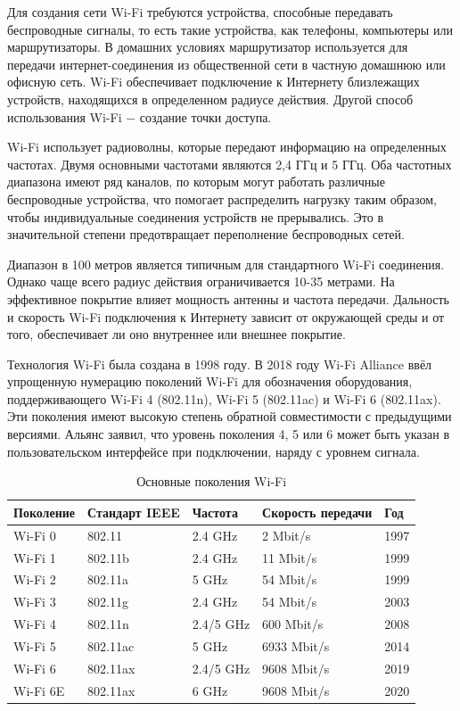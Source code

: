 	Для создания сети Wi-Fi требуются устройства, способные передавать беспроводные сигналы, то есть 
	такие устройства, как телефоны, компьютеры или маршрутизаторы. В домашних условиях маршрутизатор 
	используется для передачи интернет-соединения из общественной сети в частную домашнюю или офисную 
	сеть. Wi-Fi обеспечивает подключение к Интернету близлежащих устройств, находящихся в определенном 
	радиусе действия. Другой способ использования Wi-Fi $-$ создание точки доступа.
	
	Wi-Fi использует радиоволны, которые передают информацию на определенных частотах. Двумя основными
	частотами являются 2,4 ГГц и 5 ГГц. Оба частотных диапазона имеют ряд каналов, по которым могут 
	работать различные беспроводные устройства, что помогает распределить нагрузку таким образом, 
	чтобы индивидуальные соединения устройств не прерывались. Это в значительной степени предотвращает 
	переполнение беспроводных сетей.
	
	Диапазон в 100 метров является типичным для стандартного Wi-Fi соединения. Однако чаще всего радиус 
	действия ограничивается 10-35 метрами. На эффективное покрытие влияет мощность антенны 
	и частота передачи. Дальность и скорость Wi-Fi подключения к Интернету зависит от окружающей среды 
	и от того, обеспечивает ли оно внутреннее или внешнее покрытие.
	
	Технология Wi-Fi была создана в 1998 году. В 2018 году Wi-Fi Alliance \cite{wi-fi-alliance} ввёл упрощенную 
	нумерацию поколений Wi-Fi для обозначения оборудования, поддерживающего Wi-Fi 4 (802.11n), 
	Wi-Fi 5 (802.11ac) и Wi-Fi 6 (802.11ax). Эти поколения имеют высокую степень обратной совместимости 
	с предыдущими версиями. Альянс заявил, что уровень поколения 4, 5 или 6 может быть указан в 
	пользовательском интерфейсе при подключении, наряду с уровнем сигнала.
	
	\begin{table}[h]
		\centering
		\caption{Основные поколения Wi-Fi}
		\begin{tabular}{ | l | l | l | l | l | }
			\hline
			Поколение & Стандарт IEEE & Частота & Скорость передачи & Год \\ \hline
			Wi-Fi 0 & 802.11 & 2.4 GHz & 2 Mbit/s & 1997 \\ \hline
			Wi-Fi 1 & 802.11b & 2.4 GHz & 11 Mbit/s & 1999 \\ \hline
			Wi-Fi 2 & 802.11a & 5 GHz & 54 Mbit/s & 1999 \\ \hline
			Wi-Fi 3 & 802.11g & 2.4 GHz & 54 Mbit/s & 2003 \\ \hline
			Wi-Fi 4 & 802.11n & 2.4/5 GHz & 600 Mbit/s & 2008 \\ \hline
			Wi-Fi 5 & 802.11ac & 5 GHz & 6933 Mbit/s & 2014 \\ \hline
			Wi-Fi 6 & 802.11ax & 2.4/5 GHz & 9608 Mbit/s & 2019 \\ \hline
			Wi-Fi 6E & 802.11ax & 6 GHz & 9608 Mbit/s & 2020 \\
			\hline
		\end{tabular}
		\label{table-wi-fi-generations}
	\end{table}
	
